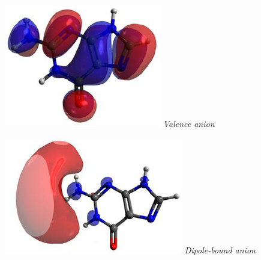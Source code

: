 \begin{figure}[h]
  \centering
  \begin{minipage}[b]{0.27\textwidth}
    \centering
    \includegraphics[width=\textwidth]{chapters/introduction/image/vbaDNA.png}
    \small\emph{Valence anion}
  \end{minipage}
  \hfill
  \begin{minipage}[b]{0.30\textwidth}
    \centering
    \includegraphics[width=\textwidth]{chapters/introduction/image/dbaDNA.png}
    \small\emph{Dipole-bound anion}
  \end{minipage}
  \hfill
  \begin{minipage}[b]{0.27\textwidth}
    \centering

\end{minipage}
\end{figure}
